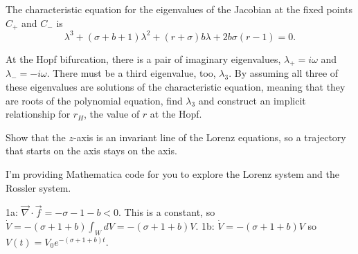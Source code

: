 \documentclass[12pt,letterpaper,noanswers]{exam}
\begin{document}
\begin{questions}
\begin{parts}
\end{parts}

\question The characteristic equation for the eigenvalues of the Jacobian at the fixed points $C_+$ and $C_-$ is
\[\lambda^3 + (\sigma + b + 1)\lambda^2 + (r+\sigma) b \lambda + 2 b \sigma (r-1) = 0.\]

At the Hopf bifurcation, there is a pair of imaginary eigenvalues, $\lambda_+ = i\omega$ and $\lambda_- = -i\omega$.
There must be a third eigenvalue, too, $\lambda_3$.  By assuming all three of these eigenvalues are solutions of the characteristic equation, meaning that they
are roots of the polynomial equation, find $\lambda_3$ and construct an implicit relationship for $r_H$, the value of $r$ at the Hopf.

\question Show that the $z$-axis is an invariant line of the Lorenz equations, so a trajectory that starts on the axis stays on the axis.

\item I'm providing Mathematica code for you to explore the Lorenz system and the Rossler system.

\end{questions}

\eject
1a: $\vec\nabla \cdot \vec f = -\sigma -1 -b < 0$.  This is a constant, so $\dot V = -(\sigma + 1 + b)\int_W dV = -(\sigma + 1 + b)V$. 1b: $\dot V = -(\sigma + 1 + b)V$ so $V(t) = V_0 e^{-(\sigma+1+b)t}.$
\end{document}
